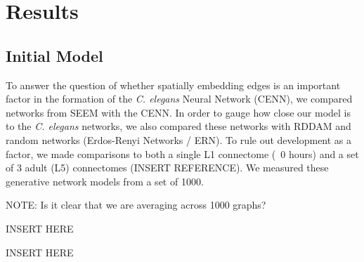 \section{Results}


\subsection{Initial Model}

To answer the question of whether spatially embedding edges is an important factor in the formation of the \textit{C. elegans} Neural Network (CENN), we compared networks from SEEM with the CENN. In order to gauge how close our model is to the \textit{C. elegans} networks, we also compared these networks with RDDAM and random networks (Erdos-Renyi Networks / ERN). To rule out development as a factor, we made comparisons to both a single L1 connectome (~0 hours) and a set of 3 adult (L5) connectomes (INSERT REFERENCE). We measured these generative network models from a set of 1000.

NOTE: Is it clear that we are averaging across 1000 graphs?

\begin{table}[H]
  \caption{INSERT HERE}
\end{table}

\begin{table}[H]
  \caption{INSERT HERE}
\end{table}

